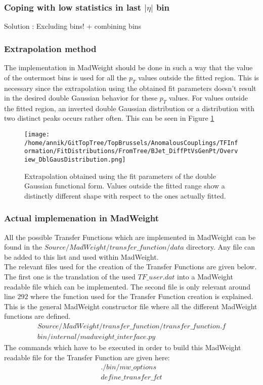 \subsubsection{Coping with low statistics in last $\vert \eta \vert$ bin}
Solution : Excluding bins! + combining bins

\subsubsection{Extrapolation method}
The implementation in MadWeight should be done in such a way that the value of the outermost bins is used for all the $p_T$ values outside the fitted region. This is necessary since the extrapolation using the obtained fit parameters doesn't result in the desired double Gaussian behavior for these $p_T$ values. For values outside the fitted region, an inverted double Gaussian distribution or a distribution with two distinct peaks occurs rather often. This can be seen in Figure \ref{fig::doubleGaussExtrap}
\begin{figure}[!h]
  \centering
  \texttt{[image: /home/annik/GitTopTree/TopBrussels/AnomalousCouplings/TFInformation/FitDistributions/FromTree/BJet\_DiffPtVsGenPt/Overview\_DblGausDistribution.png]}
  \caption{Extrapolation obtained using the fit parameters of the double Gaussian functional form. Values outside the fitted range show a distinctly different shape with respect to the ones actually fitted.} \label{fig::doubleGaussExtrap} 
\end{figure}

\subsubsection{Actual implemenation in MadWeight}
All the possible Transfer Functions which are implemented in MadWeight can be found in the $Source/MadWeight/transfer\_function/data$ directory. Any file can be added to this list and used within MadWeight.\\
The relevant files used for the creation of the Transfer Functions are given below. The first one is the translation of the used $TF\_user.dat$ into a MadWeight readable file which can be implemented. The second file is only relevant around line $292$ where the function used for the Transfer Function creation is explained. This is the general MadWeight constructor file where all the different MadWeight functions are defined.
\begin{eqnarray} 
 Source/MadWeight/transfer\_function/transfer\_function.f \nonumber \\
 bin/internal/madweight\_interface.py \nonumber
\end{eqnarray}
The commands which have to be executed in order to build this MadWeight readable file for the Transfer Function are given here:
\begin{eqnarray} 
 ./bin/mw\_options \nonumber \\
 define\_transfer\_fct \nonumber
\end{eqnarray}

